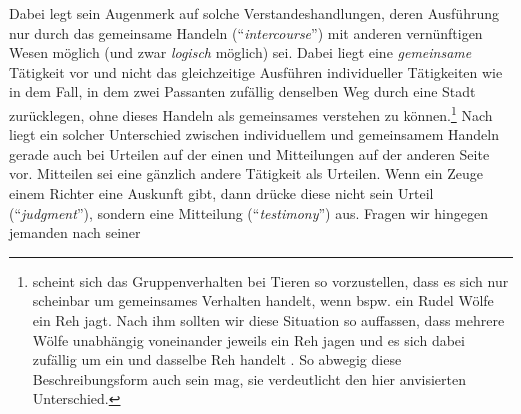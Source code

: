 \begin{comment}
Gerade in der Analytischen Philosophie ist bis heute die Tendenz verbreitet,
gemeinsames Handeln und kollektive Intentionalität als (komplexes) Gefüge jeweils
individueller Handlungen und Intentionen zu analysieren.
\footnote{\authorfullcite{Tuomela:We-intentions1988} fachten eine Diskussion um den
ontologischen Status kollektiver Intentionalität an, in der
\authorfullcite{Searle:CollectiveIntentionsandActions1992} die
anti-reduktionistische Gegenposition vertrat, wonach kollektive Intentionalität
ein nicht-reduzierbares und natürliches Phänomen
darstellt; \cite[vgl.][]{Tuomela:We-intentions1988} sowie die neueren
Ausführungen in \cite{Tuomela:We-IntentionsRevisited2005}, in denen Raimo
\authorcite{Tuomela:We-IntentionsRevisited2005} auf Einwände eingeht.
\cite[Vgl.][]{Searle:CollectiveIntentionsandActions1992}.
Siehe auch die von \textcite{Tuomela:We-IntentionsRevisited2005} angeführte und
diskutierte Literatur.}\end{comment}
Dabei legt  sein
Augenmerk auf solche Verstandeshandlungen, deren Ausführung nur durch das
gemeinsame Handeln (\enquote{\emph{intercourse}}) mit anderen vernünftigen Wesen
möglich (und zwar \emph{logisch} möglich) sei.  Dabei liegt eine
\emph{gemeinsame} Tätigkeit vor und nicht das gleichzeitige Ausführen
individueller Tätigkeiten wie in dem Fall, in dem zwei Passanten zufällig
denselben Weg durch eine Stadt zurücklegen, ohne dieses Handeln als gemeinsames
verstehen zu
können.\footnote{ scheint sich
das Gruppenverhalten bei Tieren so vorzustellen, dass es sich nur scheinbar um
gemeinsames Verhalten handelt, wenn bspw. ein Rudel Wölfe ein Reh jagt. Nach ihm
sollten wir diese Situation so auffassen, dass mehrere Wölfe unabhängig
voneinander jeweils ein Reh jagen und es sich dabei zufällig um ein und dasselbe
Reh handelt \parencite[vgl.][16]{Smith:DerWohlstandderNationen1993}. So abwegig
diese Beschreibungsform auch sein mag, sie verdeutlicht den hier anvisierten
Unterschied.} Nach 
liegt ein solcher Unterschied zwischen individuellem und gemeinsamem Handeln
gerade auch bei Urteilen auf der einen und Mitteilungen auf der anderen Seite
vor. Mitteilen sei eine gänzlich andere Tätigkeit als Urteilen. Wenn ein Zeuge
einem Richter eine Auskunft gibt, dann drücke diese nicht sein Urteil
(\enquote{\emph{judgment}}), sondern eine Mitteilung
(\enquote{\emph{testimony}}) aus. Fragen wir hingegen jemanden nach seiner
